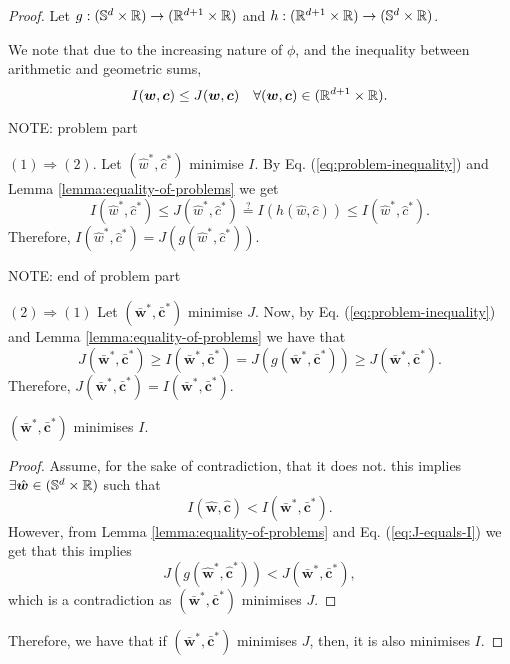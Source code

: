 \documentclass[twoside]{article}
\begin{document}
\begin{proof}
	Let $g: (\mathbb{S}^{d} \times \mathbb{R}) \to (\mathbb{R}^{d + 1}\times \mathbb{R})$ and
	$h: (\mathbb{R}^{d + 1}\times \mathbb{R}) \to (\mathbb{S}^{d} \times \mathbb{R})$.

	We note that due to the increasing nature of $\phi$,
	and the inequality between arithmetic and geometric sums,
	\begin{equation}\label{eq:problem-inequality}
		I(\bm{w}, \bm{c}) \leq J(\bm{w}, \bm{c})
		\quad \forall (\bm{w}, \bm{c}) \in (\mathbb{R}^{d + 1}\times \mathbb{R}).
	\end{equation}

    NOTE: problem part

	$(1) \Rightarrow (2)$.
	Let $(\hat{w}^{*}, \hat{c}^{*})$ minimise $I$. By Eq. (\ref{eq:problem-inequality}) and
	Lemma \ref{lemma:equality-of-problems} we get
	\begin{equation*}
		I(\hat{w}^{*}, \hat{c}^{*}) \leq J(\hat{w}^{*}, \hat{c}^{*})
		\stackrel{?}{=} I(h(\hat{w}, \hat{c})) \leq I(\hat{w}^{*}, \hat{c}^{*}).
	\end{equation*}
	Therefore, $I(\hat{w}^{*}, \hat{c}^{*}) = J(g(\hat{w}^{*}, \hat{c}^{*}))$.

    NOTE: end of problem part


	$(2) \Rightarrow (1)$
	Let $(\bar{\bm{w}}^{*}, \bar{\bm{c}}^{*})$ minimise $J$.
	Now, by Eq. (\ref{eq:problem-inequality}) and Lemma \ref{lemma:equality-of-problems} we have that
	\begin{equation}\label{eq:J-equals-I}
		J(\bar{\bm{w}}^{*}, \bar{\bm{c}}^{*}) \geq I(\bar{\bm{w}}^{*}, \bar{\bm{c}}^{*})
		= J(g(\bar{\bm{w}}^{*}, \bar{\bm{c}}^{*})) \geq J(\bar{\bm{w}}^{*}, \bar{\bm{c}}^{*}).
	\end{equation}
	Therefore, $J(\bar{\bm{w}}^{*}, \bar{\bm{c}}^{*}) = I(\bar{\bm{w}}^{*}, \bar{\bm{c}}^{*})$.

	\begin{claim}
		$(\bar{\bm{w}}^{*}, \bar{\bm{c}}^{*})$ minimises $I$.

		\begin{proof}
			Assume, for the sake of contradiction, that it does not. this implies
			$\exists \hat{\bm{w}} \in (\mathbb{S}^{d} \times \mathbb{R})$ such that
			\begin{equation*}
				I(\hat{\bm{w}}, \hat{\bm{c}}) < I(\bar{\bm{w}}^{*}, \bar{\bm{c}}^{*}).
			\end{equation*}
			However, from Lemma \ref{lemma:equality-of-problems} and Eq. (\ref{eq:J-equals-I})
			we get that this implies
			\begin{equation*}
				J(g(\hat{\bm{w}}^{*}, \hat{\bm{c}}^{*})) < J(\bar{\bm{w}}^{*}, \bar{\bm{c}}^{*}),
			\end{equation*}
			which is a contradiction as $(\bar{\bm{w}}^{*}, \bar{\bm{c}}^{*})$ minimises $J$.
		\end{proof}
	\end{claim}
	Therefore, we have that if $(\bar{\bm{w}}^{*}, \bar{\bm{c}}^{*})$ minimises $J$, then,
    it is also minimises $I$.
\end{proof}
\end{document}
